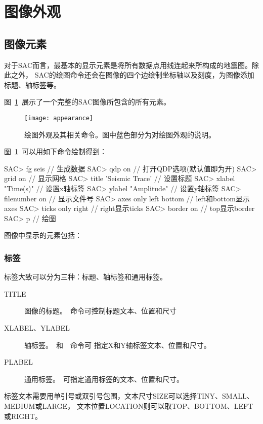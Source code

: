 \section{图像外观}
\label{sec:plot-appearance}

\subsection{图像元素}
对于SAC而言，最基本的显示元素是将所有数据点用线连起来所构成的地震图。除此之外，
SAC的绘图命令还会在图像的四个边绘制坐标轴以及刻度，为图像添加标题、轴标签等。

图~\ref{fig:plot-appearance}~展示了一个完整的SAC图像所包含的所有元素。

\begin{figure}[H]
\centering
\texttt{[image: appearance]}
\caption[绘图外观相关命令]{绘图外观及其相关命令。图中蓝色部分为对绘图外观的说明。}
\label{fig:plot-appearance}
\end{figure}

图~\ref{fig:plot-appearance}~可以用如下命令绘制得到：
\begin{SACCode}
SAC> fg seis                // 生成数据
SAC> qdp on                 // 打开QDP选项(默认值即为开)
SAC> grid on                // 显示网格
SAC> title 'Seismic Trace'  // 设置标题
SAC> xlabel "Time(s)"       // 设置x轴标签
SAC> ylabel "Amplitude"     // 设置y轴标签
SAC> filenumber on          // 显示文件号
SAC> axes only left bottom  // left和bottom显示axes
SAC> ticks only right       // right显示ticks
SAC> border on              // top显示border
SAC> p                      // 绘图
\end{SACCode}

图像中显示的元素包括：
\subsubsection{标签}
标签大致可以分为三种：标题、轴标签和通用标签。
\begin{description}
\item[TITLE] 图像的标题。~命令可控制标题文本、位置和尺寸
\item[XLABEL、YLABEL] 轴标签。~和~~命令可
    指定X和Y轴标签文本、位置和尺寸。
\item[PLABEL] 通用标签。~可指定通用标签的文本、位置和尺寸。
\end{description}

标签文本需要用单引号或双引号包围，文本尺寸SIZE可以选择TINY、SMALL、MEDIUM或LARGE，
文本位置LOCATION则可以取TOP、BOTTOM、LEFT或RIGHT。

